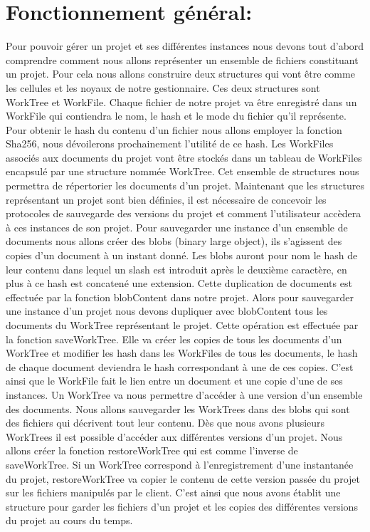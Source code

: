 \documentclass[11pt,francais]{article}
\begin{document}
\section{Fonctionnement général:}
	Pour pouvoir gérer un projet et ses différentes instances nous devons tout d’abord comprendre comment nous allons représenter un ensemble de fichiers constituant un projet. Pour cela nous allons construire deux structures qui vont être comme les cellules et les noyaux de notre gestionnaire. Ces deux structures sont WorkTree et WorkFile. \newline
	Chaque fichier de notre projet va être enregistré dans un WorkFile qui contiendra le nom, le hash et le mode du fichier qu’il représente. Pour obtenir le hash du contenu d’un fichier nous allons employer la fonction Sha256, nous dévoilerons prochainement l’utilité de ce hash. Les WorkFiles associés aux documents du projet vont être stockés dans un tableau de WorkFiles encapsulé par une structure nommée WorkTree. Cet ensemble de structures nous permettra de répertorier les documents d’un projet.
	 Maintenant que les structures représentant un projet sont bien définies, il est nécessaire de concevoir les protocoles de sauvegarde des versions du projet et comment l’utilisateur accèdera à ces instances de son projet.
	Pour sauvegarder une instance d’un ensemble de documents nous allons créer des blobs (binary large object), ils s’agissent des copies d’un document à un instant donné. Les blobs auront pour nom le hash de leur contenu dans lequel un slash est introduit après le deuxième caractère, en plus à ce hash est concatené une extension. Cette duplication de documents est effectuée par la fonction blobContent dans notre projet. \newline
	Alors pour sauvegarder une instance d’un projet nous devons  dupliquer avec blobContent tous les documents du WorkTree  représentant le projet. Cette opération est effectuée par la fonction saveWorkTree. Elle va créer les copies de tous les documents d’un WorkTree et modifier les hash dans les WorkFiles de tous les documents, le hash de chaque document deviendra le hash correspondant à une de ces copies. C’est ainsi que le WorkFile fait le lien entre un document et une copie d’une de ses instances. Un WorkTree va nous permettre d’accéder à une version d’un ensemble des documents. Nous allons sauvegarder les WorkTrees dans des blobs qui sont des fichiers qui décrivent tout leur contenu. \newline
	Dès que nous avons plusieurs WorkTrees il est possible d’accéder aux différentes versions d’un projet.  Nous allons créer la fonction restoreWorkTree qui  est comme l’inverse de saveWorkTree. Si un WorkTree correspond à l’enregistrement d’une instantanée du projet,  restoreWorkTree va copier le contenu de cette version passée du projet sur les fichiers manipulés par le client. C’est ainsi que nous avons établit une structure pour garder les fichiers d’un projet et les copies des différentes versions du projet au cours du temps. \newline \newline
\end{document}
